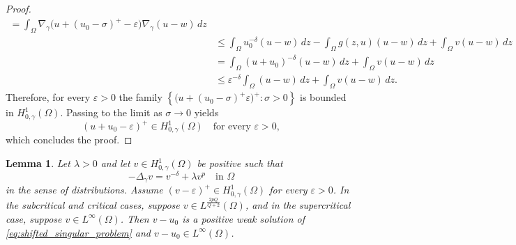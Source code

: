 \documentclass[11pt]{article}
\newtheorem{lemma}{Lemma}[section] %
\newcommand{\Gr}{\Delta_{\gamma}}
\newcommand{\gradgr}{\nabla_{\gamma}}
\newcommand{\spacegr}{H^{1}_{0,\gamma}(\Omega)}
\begin{document}
\begin{proof}
\begin{equation*}
\begin{aligned}
=
\int_{\Omega}
\gradgr\big(u+(u_{0}-\sigma)^+-\varepsilon\big)\gradgr(u-w)\,dz \\
&\le
\int_{\Omega}u_{0}^{-\delta}(u-w)\,dz
-\int_{\Omega}g(z,u)(u-w)\,dz
+\int_{\Omega}v(u-w)\,dz \\
&=
\int_{\Omega}(u+u_{0})^{-\delta}(u-w)\,dz
+\int_{\Omega}v(u-w)\,dz \\
&\le
\varepsilon^{-\delta}\int_{\Omega}(u-w)\,dz
+\int_{\Omega}v(u-w)\,dz .
\end{aligned}
\end{equation*}
Therefore, for every $\varepsilon>0$ the family $\left\{ \big(u+(u_{0}-\sigma)^+ \varepsilon\big)^+:\sigma>0 \right\}$ is bounded in $\spacegr$. Passing to the limit as $\sigma\to0$ yields
\[
(u+u_{0}-\varepsilon)^+ \in \spacegr
\quad \text{for every } \varepsilon>0,
\]
which concludes the proof.
\end{proof}

\begin{lemma}
Let $\lambda>0$ and let $v\in \spacegr$ be positive such that
\begin{equation*}
-\Gr v = v^{-\delta} + \lambda v^p
\quad \text{in } \Omega
\end{equation*}
in the sense of distributions. Assume $(v-\varepsilon)^+ \in \spacegr$ for every $\varepsilon>0$. In the subcritical and critical cases, suppose $v\in L^{\frac{2pQ}{Q+2}}(\Omega)$, and in the supercritical case, suppose $v\in L^\infty(\Omega)$. Then $v-u_{0}$ is a positive weak solution of \eqref{eq:shifted_singular_problem} and $v-u_{0}\in L^\infty(\Omega)$.
\end{lemma}
\end{document}
